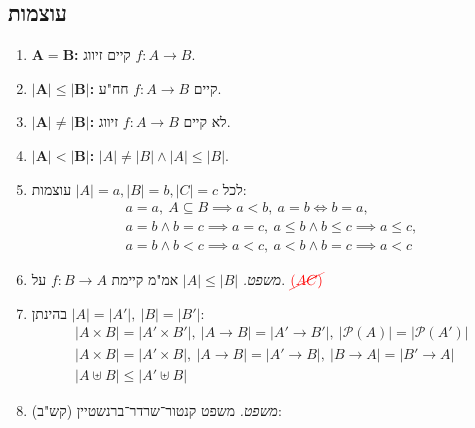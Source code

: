 \documentclass[]{article}
\newcommand\ps    {\mathcal{P}}
\newcommand\tho       {\textit{משפט. }}
\newcommand\nac       {$\color{red}\cancel{(AC)}\color{black}$}
\begin{document}
\begin{multicols}{2}
		\section{עוצמות}
		\begin{enumerate}[resume]
			\item $\bm{A = B}$\textbf{: }קיים זיווג $f \colon A \to B$. 
			\item $\bm{|A| \le |B|}$\textbf{: }קיים $f \colon A \to B$ חח"ע. 
			\item $\bm{|A| \neq |B|}$\textbf{: }לא קיים $f \colon A \to B$ זיווג. 
			\item $\bm{|A| < |B|}$\textbf{: }$|A| \neq |B| \land |A| \le |B|$. 
			\item לכל $|A| = a, |B| = b, |C| = c$ עוצמות: 
			\begin{gather*}
				a = a, \ A \subseteq B \implies a < b, \ a = b \iff b = a, \ \\
				a = b \land b = c \implies a = c, \ a \le b \land b \le c \implies a \le c, \\
				a = b \land b < c \implies a < c, \ a < b \land b = c \implies a < c
			\end{gather*}
			\item \tho $|A| \le |B|$ אמ"מ קיימת $f \colon B \to A$ על. \hfill \nac
			\item בהינתן $|A| = |A'|, \ |B| = |B'|$: 
			\begin{gather*}
				|A \times B| = |A' \times B'|, \ |A \to B| = |A' \to B'|, \ |\ps(A)| = |\ps(A')| \\
				|A \times B| = |A' \times B|, \ |A \to B| = |A' \to B|, \ |B \to A| = |B' \to A| \\
				|A \uplus B| \le |A' \uplus B|
			\end{gather*}
			\item \tho משפט קנטור־שרדר־ברנשטיין (קש"ב): 
				

\end{enumerate}
\end{multicols}
\end{document}
